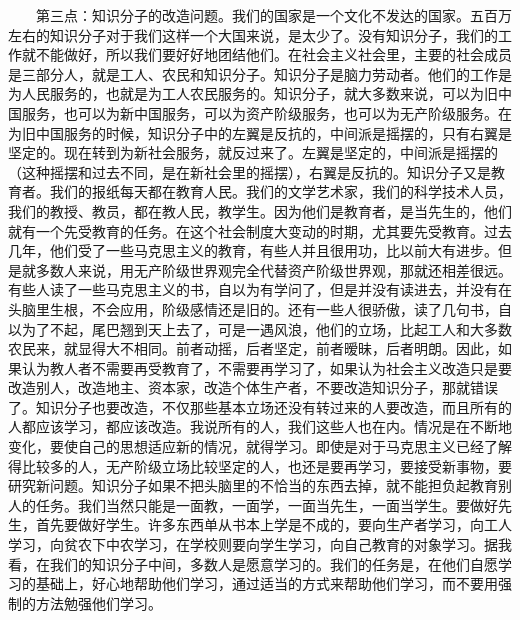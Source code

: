 \documentclass[cn,11pt,chinese]{elegantbook}
\begin{document}
　　第三点：知识分子的改造问题。我们的国家是一个文化不发达的国家。五百万左右的知识分子对于我们这样一个大国来说，是太少了。没有知识分子，我们的工作就不能做好，所以我们要好好地团结他们。在社会主义社会里，主要的社会成员是三部分人，就是工人、农民和知识分子。知识分子是脑力劳动者。他们的工作是为人民服务的，也就是为工人农民服务的。知识分子，就大多数来说，可以为旧中国服务，也可以为新中国服务，可以为资产阶级服务，也可以为无产阶级服务。在为旧中国服务的时候，知识分子中的左翼是反抗的，中间派是摇摆的，只有右翼是坚定的。现在转到为新社会服务，就反过来了。左翼是坚定的，中间派是摇摆的（这种摇摆和过去不同，是在新社会里的摇摆），右翼是反抗的。知识分子又是教育者。我们的报纸每天都在教育人民。我们的文学艺术家，我们的科学技术人员，我们的教授、教员，都在教人民，教学生。因为他们是教育者，是当先生的，他们就有一个先受教育的任务。在这个社会制度大变动的时期，尤其要先受教育。过去几年，他们受了一些马克思主义的教育，有些人并且很用功，比以前大有进步。但是就多数人来说，用无产阶级世界观完全代替资产阶级世界观，那就还相差很远。有些人读了一些马克思主义的书，自以为有学问了，但是并没有读进去，并没有在头脑里生根，不会应用，阶级感情还是旧的。还有一些人很骄傲，读了几句书，自以为了不起，尾巴翘到天上去了，可是一遇风浪，他们的立场，比起工人和大多数农民来，就显得大不相同。前者动摇，后者坚定，前者暧昧，后者明朗。因此，如果认为教人者不需要再受教育了，不需要再学习了，如果认为社会主义改造只是要改造别人，改造地主、资本家，改造个体生产者，不要改造知识分子，那就错误了。知识分子也要改造，不仅那些基本立场还没有转过来的人要改造，而且所有的人都应该学习，都应该改造。我说所有的人，我们这些人也在内。情况是在不断地变化，要使自己的思想适应新的情况，就得学习。即使是对于马克思主义已经了解得比较多的人，无产阶级立场比较坚定的人，也还是要再学习，要接受新事物，要研究新问题。知识分子如果不把头脑里的不恰当的东西去掉，就不能担负起教育别人的任务。我们当然只能是一面教，一面学，一面当先生，一面当学生。要做好先生，首先要做好学生。许多东西单从书本上学是不成的，要向生产者学习，向工人学习，向贫农下中农学习，在学校则要向学生学习，向自己教育的对象学习。据我看，在我们的知识分子中间，多数人是愿意学习的。我们的任务是，在他们自愿学习的基础上，好心地帮助他们学习，通过适当的方式来帮助他们学习，而不要用强制的方法勉强他们学习。\\
\end{document}
